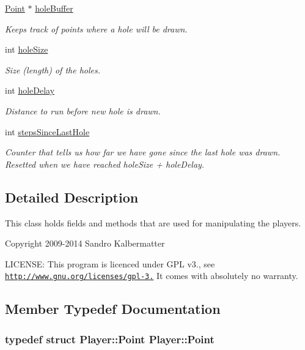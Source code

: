 \begin{DoxyCompactItemize}
\hyperlink{structPlayer_1_1Point}{Point} $\ast$ \hyperlink{classPlayer_a1f4cf1d0ad8148a43a698a548d0d01f7}{hole\+Buffer}
\begin{DoxyCompactList}\small\item\em Keeps track of points where a hole will be drawn. \end{DoxyCompactList}\item 
int \hyperlink{classPlayer_a9ba2271607df07a07d2454a32fe39f78}{hole\+Size}
\begin{DoxyCompactList}\small\item\em Size (length) of the holes. \end{DoxyCompactList}\item 
int \hyperlink{classPlayer_a51eb1ca4a5ecc06e99501900b8e8b7e8}{hole\+Delay}
\begin{DoxyCompactList}\small\item\em Distance to run before new hole is drawn. \end{DoxyCompactList}\item 
int \hyperlink{classPlayer_ab2eab1f5836b101d675d7e8fe885308d}{steps\+Since\+Last\+Hole}
\begin{DoxyCompactList}\small\item\em Counter that tells us how far we have gone since the last hole was drawn. Resetted when we have reached hole\+Size + hole\+Delay. \end{DoxyCompactList}\end{DoxyCompactItemize}


\subsection{Detailed Description}
This class holds fields and methods that are used for manipulating the players.

Copyright 2009-\/2014 Sandro Kalbermatter

L\+I\+C\+E\+N\+S\+E\+: This program is licenced under G\+P\+L v3., see \href{http://www.gnu.org/licenses/gpl-3.0}{\tt http\+://www.\+gnu.\+org/licenses/gpl-\/3.} It comes with absolutely no warranty. 

\subsection{Member Typedef Documentation}
\hypertarget{classPlayer_a9a42f90c20c3a394c3c3dab176b8c9a0}{}
\subsubsection[{Point}]{\setlength{\rightskip}{0pt plus 5cm}typedef struct {\bf Player\+::\+Point}  {\bf Player\+::\+Point}\hspace{0.3cm}{\ttfamily [private]}}\label{classPlayer_a9a42f90c20c3a394c3c3dab176b8c9a0}


